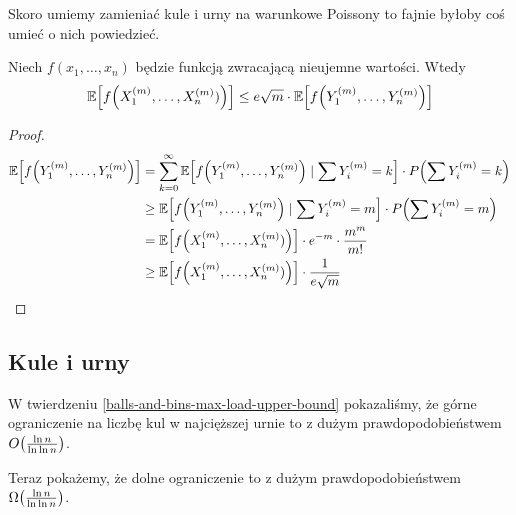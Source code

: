 Skoro umiemy zamieniać kule i urny na warunkowe Poissony to fajnie byłoby coś umieć o nich powiedzieć. 

\begin{theorem}
    \label{poisson-approximation-for-any-function}
    Niech \( f(x_1, \dots, x_n) \) będzie funkcją zwracającą nieujemne wartości. Wtedy
    \[
        \expected{f\pars{X_1^{(m)}, \dots, X_n^{(m)})}} \leq e\sqrt{m} \cdot \expected{f\pars{Y_1^{(m)}, \dots, Y_n^{(m)}}}
    \]
\end{theorem}
\begin{proof}
\begin{align*}
    \expected{f\pars{Y_1^{(m)}, \dots, Y_n^{(m)}}} 
        &= \sum_{k=0}^\infty \expected{f\pars{Y_1^{(m)}, \dots, Y_n^{(m)}} \mid \sum Y_i^{(m)} = k} \cdot P\pars{\sum Y_i^{(m)} = k} \\
        &\geq \expected{f\pars{Y_1^{(m)}, \dots, Y_n^{(m)}} \mid \sum Y_i^{(m)} = m} \cdot P\pars{\sum Y_i^{(m)} = m} \\
        &= \expected{f\pars{X_1^{(m)}, \dots, X_n^{(m)})}} \cdot e^{-m} \cdot \frac{m^m}{m!} \\
        &\geq \expected{f\pars{X_1^{(m)}, \dots, X_n^{(m)})}} \cdot \frac{1}{e\sqrt{m}}
\end{align*}
\end{proof}

\subsection{Kule i urny}
W twierdzeniu \ref{balls-and-bins-max-load-upper-bound} pokazaliśmy, że górne ograniczenie na liczbę kul w najcięższej urnie to z dużym prawdopodobieństwem \( O\pars{\frac{\ln n}{\ln \ln n}} \).

Teraz pokażemy, że dolne ograniczenie to z dużym prawdopodobieństwem \( \Omega\pars{\frac{\ln n}{\ln \ln n}} \).

